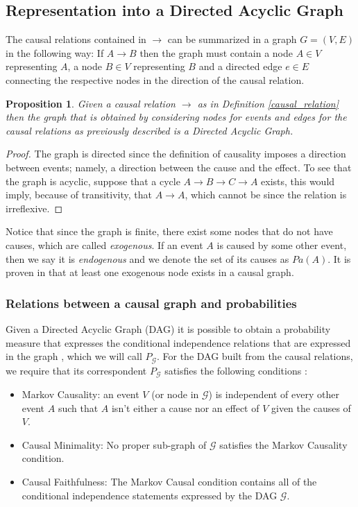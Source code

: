\documentclass[review]{elsarticle}
\newtheorem{proposition}[theorem]{Proposition}
\begin{document}
\subsection{Representation into a Directed Acyclic Graph}
The causal relations contained in $\to$ can be summarized in a graph $G=(V,E)$ in the following way: If $A \to B$ then the graph must contain a node $A \in V$ representing $A$, a node  $B \in V$ representing $B$ and a directed edge $e \in E$ connecting the respective nodes in the direction of the causal relation.

\begin{proposition}
Given a causal relation $\to$ as in Definition \ref{causal_relation} then the graph that is obtained by considering nodes for events and edges for the causal relations as previously described is a Directed Acyclic Graph.
\end{proposition}

\begin{proof}
The graph is directed since the definition of causality imposes a direction between events; namely, a direction between the cause and the effect. To see that the graph is acyclic, suppose that a cycle $A \to B \to C \to A$ exists, this would imply, because of transitivity, that $A \to A$, which cannot be since the relation is irreflexive.
\end{proof}

Notice that since the graph is finite, there exist some nodes that do not have causes, which are called \textit{exogenous}. If an event $A$ is caused by some other event, then we say it is \textit{endogenous} and we denote the set of its causes as $Pa(A)$. It is proven in \cite{kiiveri1984recursive} that at least one exogenous node exists in a causal graph.

\subsubsection{Relations between a causal graph and probabilities}
Given a Directed Acyclic Graph (DAG) it is possible to obtain a probability measure that expresses the conditional independence relations that are expressed in the graph \citep{koller2009probabilistic}, which we will call $P_\mathcal{G}$. For the DAG built from the causal relations, we require that its correspondent $P_\mathcal{G}$ satisfies the following conditions \citep{spirtes2000causation}:
\begin{itemize}
\item Markov Causality: an event $V$ (or node in $\mathcal{G}$) is independent of every other event $A$ such that $A$ isn't either a cause nor an effect of $V$ given the causes of $V$.
\item Causal Minimality: No proper sub-graph of $\mathcal{G}$ satisfies the Markov Causality condition.
\item Causal Faithfulness: The Markov Causal condition contains all of the conditional independence statements expressed by the DAG $\mathcal{G}$.
\end{itemize}
\end{document}
